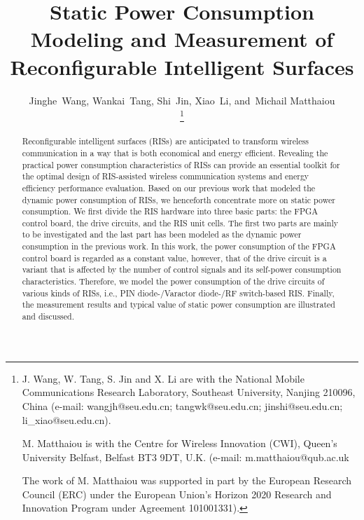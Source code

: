 \documentclass[journal]{IEEEtran}
\begin{document}
\title{Static Power Consumption Modeling and Measurement of Reconfigurable Intelligent Surfaces }


\author{Jinghe~Wang, Wankai~Tang, Shi~Jin, Xiao~Li, and~Michail Matthaiou
	
\thanks{J.  Wang, W. Tang, S. Jin and X. Li are with the National Mobile Communications Research Laboratory, Southeast University, Nanjing 210096, China  (e-mail: wangjh@seu.edu.cn; tangwk@seu.edu.cn; jinshi@seu.edu.cn; li\_xiao@seu.edu.cn).

M. Matthaiou is with the Centre for Wireless Innovation (CWI), Queen’s University Belfast, Belfast BT3 9DT, U.K. (e-mail: m.matthaiou@qub.ac.uk

The work of M. Matthaiou was supported in part by the European
Research Council (ERC) under the European Union’s Horizon 2020 Research
and Innovation Program under Agreement 101001331).

}}

\maketitle

\begin{abstract}
Reconfigurable intelligent surfaces (RISs) are anticipated to transform wireless communication in a way that is both economical and energy efficient. Revealing the practical power consumption characteristics of RISs can provide an essential toolkit for the optimal design of RIS-assisted wireless communication systems and energy efficiency performance evaluation. Based on our previous work that  modeled the dynamic power consumption of RISs, we henceforth concentrate more on static power consumption. We first divide the RIS hardware into three basic parts: the FPGA control board, the drive circuits, and the RIS unit cells. The first two parts are mainly to be investigated and the last part has been modeled as the dynamic power consumption in the previous work. In this work, the power consumption of the FPGA control board is regarded as a constant value, however, that of the drive circuit is a variant that is affected by the number of control signals and its self-power consumption characteristics. Therefore, we model the power consumption of the drive circuits of various kinds of RISs, i.e., PIN diode-/Varactor diode-/RF switch-based RIS. Finally, the measurement results and typical value of static power consumption are illustrated and discussed.
\end{abstract}
\end{document}
